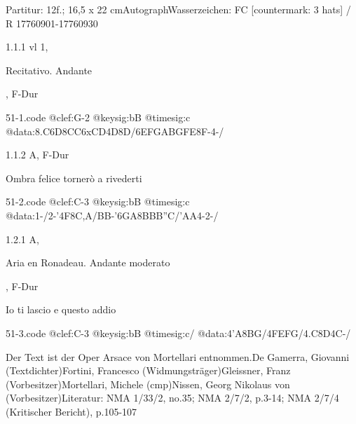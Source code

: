 \documentclass[a4paper, twocolumn, 11pt]{book}
\begin{document}
\par \textcolor{darkblue}{}  Partitur: 12f.; 16,5 x 22 cm\newline Autograph\newline Wasserzeichen: FC [countermark: 3 hats] / R  17760901-17760930
\par 1.1.1  vl 1, \begin{itshape}Recitativo. Andante\end{itshape}, F-Dur  
\begin{filecontents*}{51-1.code}
@clef:G-2
@keysig:bB
@timesig:c
@data:{8.C6D}{8CC}{6xCD}4D8D/{6EFGA}{BGFE}8F-4-/
\end{filecontents*}
\newline %
\par 1.1.2  A, F-Dur\newline \begin{footnotesize} Ombra felice tornerò a rivederti \end{footnotesize}  
\begin{filecontents*}{51-2.code}
@clef:C-3
@keysig:bB
@timesig:c
@data:1-/2-'4F8C,A/BB-'6GA8BBB''C/'AA4-2-/
\end{filecontents*}
\newline %
\par 1.2.1  A, \begin{itshape}Aria en Ronadeau. Andante moderato\end{itshape}, F-Dur\newline \begin{footnotesize} Io ti lascio e questo addio \end{footnotesize}  
\begin{filecontents*}{51-3.code}
@clef:C-3
@keysig:bB
@timesig:c/
@data:4'A{8BG}/4FEFG/4.C8D4C-/
\end{filecontents*}
\newline %
\par Der Text ist der Oper Arsace von Mortellari entnommen.\newline De Gamerra, Giovanni  (Textdichter)\newline Fortini, Francesco  (Widmungsträger)\newline Gleissner, Franz  (Vorbesitzer)\newline Mortellari, Michele  (cmp)\newline Nissen, Georg Nikolaus von  (Vorbesitzer)\newline Literatur: NMA  1/33/2, no.35; NMA  2/7/2, p.3-14; NMA  2/7/4 (Kritischer Bericht), p.105-107
\end{document}
